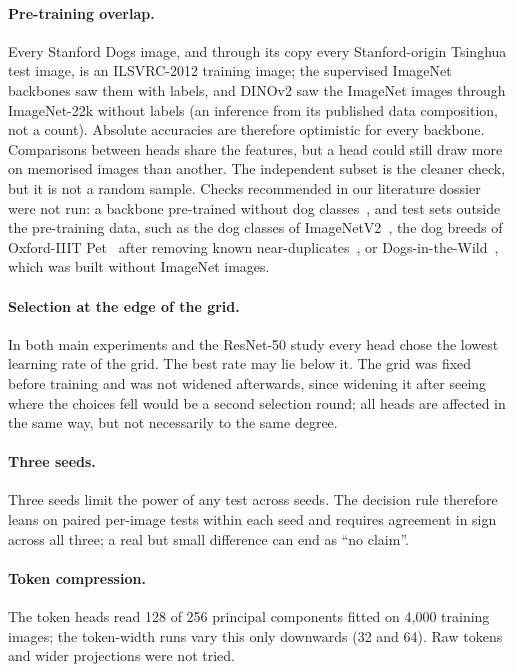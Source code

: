 \documentclass[11pt,a4paper]{article}
\theoremstyle{plain}
\begin{document}
\paragraph{Pre-training overlap.} Every Stanford Dogs image, and through its copy every Stanford-origin Tsinghua test
image, is an ILSVRC-2012 training image; the supervised ImageNet backbones saw them with labels, and DINOv2 saw the
ImageNet images through ImageNet-22k without labels (an inference from its published data composition, not a count).
Absolute accuracies are therefore optimistic for every backbone. Comparisons between heads share the features, but a
head could still draw more on memorised images than another. The independent subset is the cleaner check, but it is
not a random sample. Checks recommended in our literature dossier were not run: a backbone pre-trained without dog
classes~\citep{krause2016unreasonable,zhang2018metafgnet}, and test sets outside the pre-training data, such as the
dog classes of ImageNetV2~\citep{recht2019imagenetv2}, the dog breeds of Oxford-IIIT Pet~\citep{parkhi2012catsdogs}
after removing known near-duplicates~\citep{kolesnikov2020bit}, or Dogs-in-the-Wild~\citep{sun2018mamc}, which was
built without ImageNet images.

\paragraph{Selection at the edge of the grid.} In both main experiments and the ResNet-50 study every head chose the
lowest learning rate of the grid. The best rate may lie below it. The grid was fixed before training and was not widened afterwards, since
widening it after seeing where the choices fell would be a second selection round; all heads are affected in the same
way, but not necessarily to the same degree.

\paragraph{Three seeds.} Three seeds limit the power of any test across seeds. The decision rule therefore leans on
paired per-image tests within each seed and requires agreement in sign across all three; a real but small difference
can end as ``no claim''.

\paragraph{Token compression.} The token heads read 128 of 256 principal components fitted on 4,000 training images;
the token-width runs vary this only downwards (32 and 64). Raw tokens and wider projections were not tried.
\end{document}
